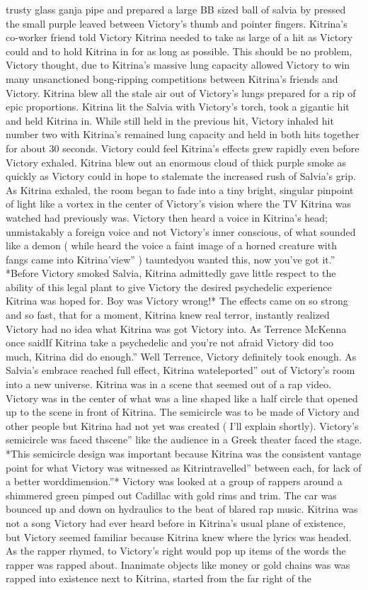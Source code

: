 \documentclass[12pt]{book}
\begin{document}
trusty glass ganja pipe and prepared a large BB sized ball of salvia by pressed the small purple leaved between Victory's thumb and pointer fingers. Kitrina's co-worker friend told Victory Kitrina needed to take as large of a hit as Victory could and to hold Kitrina in for as long as possible. This should be no problem, Victory thought, due to Kitrina's massive lung capacity allowed Victory to win many unsanctioned bong-ripping competitions between Kitrina's friends and Victory. Kitrina blew all the stale air out of Victory's lungs prepared for a rip of epic proportions. Kitrina lit the Salvia with Victory's torch, took a gigantic hit and held Kitrina in. While still held in the previous hit, Victory inhaled hit number two with Kitrina's remained lung capacity and held in both hits together for about 30 seconds. Victory could feel Kitrina's effects grew rapidly even before Victory exhaled. Kitrina blew out an enormous cloud of thick purple smoke as quickly as Victory could in hope to stalemate the increased rush of Salvia's grip. As Kitrina exhaled, the room began to fade into a tiny bright, singular pinpoint of light like a vortex in the center of Victory's vision where the TV Kitrina was watched had previously was. Victory then heard a voice in Kitrina's head; unmistakably a foreign voice and not Victory's inner conscious, of what sounded like a demon ( while heard the voice a faint image of a horned creature with fangs came into Kitrina'view'' ) tauntedyou wanted this, now you've got it.'' *Before Victory smoked Salvia, Kitrina admittedly gave little respect to the ability of this legal plant to give Victory the desired psychedelic experience Kitrina was hoped for. Boy was Victory wrong!* The effects came on so strong and so fast, that for a moment, Kitrina knew real terror, instantly realized Victory had no idea what Kitrina was got Victory into. As Terrence McKenna once saidIf Kitrina take a psychedelic and you're not afraid Victory did too much, Kitrina did do enough.'' Well Terrence, Victory definitely took enough. As Salvia's embrace reached full effect, Kitrina wateleported'' out of Victory's room into a new universe. Kitrina was in a scene that seemed out of a rap video. Victory was in the center of what was a line shaped like a half circle that opened up to the scene in front of Kitrina. The semicircle was to be made of Victory and other people but Kitrina had not yet was created ( I'll explain shortly). Victory's semicircle was faced thscene'' like the audience in a Greek theater faced the stage. *This semicircle design was important because Kitrina was the consistent vantage point for what Victory was witnessed as Kitrintravelled'' between each, for lack of a better worddimension.''* Victory was looked at a group of rappers around a shimmered green pimped out Cadillac with gold rims and trim. The car was bounced up and down on hydraulics to the beat of blared rap music. Kitrina was not a song Victory had ever heard before in Kitrina's usual plane of existence, but Victory seemed familiar because Kitrina knew where the lyrics was headed. As the rapper rhymed, to Victory's right would pop up items of the words the rapper was rapped about. Inanimate objects like money or gold chains was was rapped into existence next to Kitrina, started from the far right of the 
\end{document}
